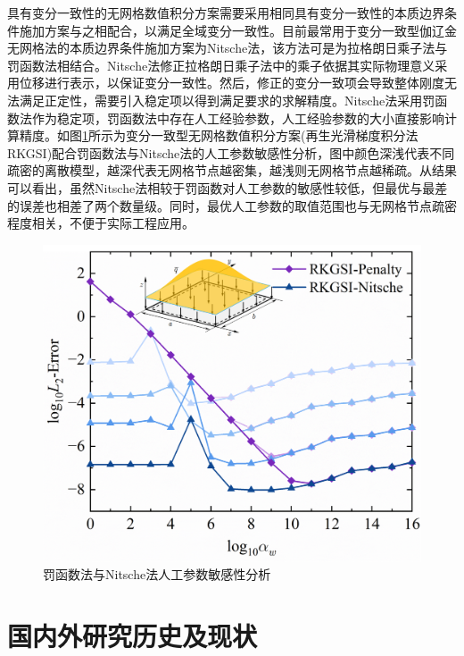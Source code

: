 具有变分一致性的无网格数值积分方案需要采用相同具有变分一致性的本质边界条件施加方案与之相配合，以满足全域变分一致性\cite{wang2016}。目前最常用于变分一致型伽辽金无网格法的本质边界条件施加方案为Nitsche法，该方法可是为拉格朗日乘子法与罚函数法相结合。Nitsche法修正拉格朗日乘子法中的乘子依据其实际物理意义采用位移进行表示，以保证变分一致性。然后，修正的变分一致项会导致整体刚度无法满足正定性，需要引入稳定项以得到满足要求的求解精度。Nitsche法采用罚函数法作为稳定项，罚函数法中存在人工经验参数，人工经验参数的大小直接影响计算精度。如图\ref{nitschepenalty}所示为变分一致型无网格数值积分方案(再生光滑梯度积分法RKGSI)配合罚函数法与Nitsche法的人工参数敏感性分析，图中颜色深浅代表不同疏密的离散模型，越深代表无网格节点越密集，越浅则无网格节点越稀疏。从结果可以看出，虽然Nitsche法相较于罚函数对人工参数的敏感性较低，但最优与最差的误差也相差了两个数量级。同时，最优人工参数的取值范围也与无网格节点疏密程度相关，不便于实际工程应用。

\begin{figure}[ht!]
\centering
    \includegraphics[scale=0.5]{figure/fig1.png}
    \caption{罚函数法与Nitsche法人工参数敏感性分析}\label{nitschepenalty}
\end{figure}

\section{国内外研究历史及现状}

